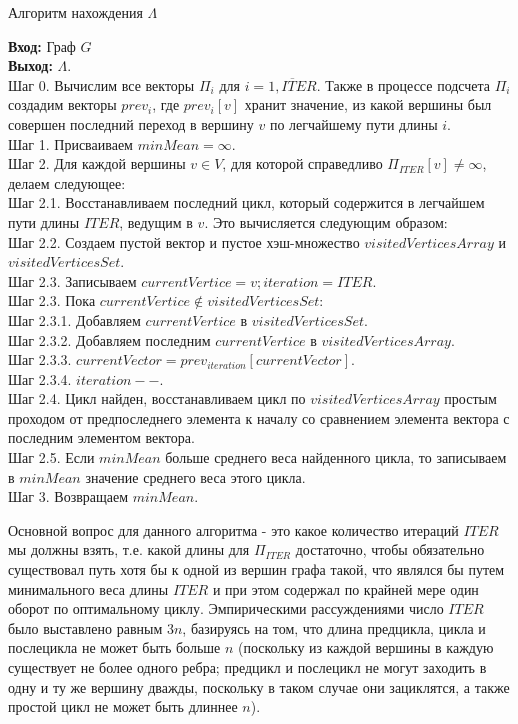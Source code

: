 \documentclass[a4paper,12pt]{report}
\theoremstyle{plain} %
\theoremstyle{definition}
\theoremstyle{remark}
\begin{document}
\begin{large}
\begin{algorithm}[H]
\caption{Алгоритм нахождения $\Lambda$}
\label{diff_graph_construct}
\textbf{Вход:} Граф $G$\\
\textbf{Выход:} $\Lambda$.\\
Шаг 0. Вычислим все векторы $\Pi_i$ для $i = \overline{1, ITER}$. Также в процессе подсчета $\Pi_i$ создадим векторы $prev_i$, где $prev_i[v]$ хранит значение, из какой вершины был совершен последний переход в вершину $v$ по легчайшему пути длины $i$.\\
Шаг 1. Присваиваем $minMean = \infty$.\\
Шаг 2. Для каждой вершины $v \in V$, для которой справедливо $\Pi_{ITER}[v] \ne \infty$, делаем следующее:\\
Шаг 2.1. Восстанавливаем последний цикл, который содержится в легчайшем пути длины $ITER$, ведущим в $v$. Это вычисляется следующим образом:\\
Шаг 2.2. Создаем пустой вектор и пустое хэш-множество $visitedVerticesArray$ и $visitedVerticesSet$.\\
Шаг 2.3. Записываем $currentVertice = v; iteration = ITER$.\\
Шаг 2.3. Пока $currentVertice \notin visitedVerticesSet$:\\
Шаг 2.3.1. Добавляем $currentVertice$ в $visitedVerticesSet$.\\
Шаг 2.3.2. Добавляем последним $currentVertice$ в $visitedVerticesArray$.\\
Шаг 2.3.3. $currentVector = prev_{iteration}[currentVector]$.\\
Шаг 2.3.4. $iteration--$.\\
Шаг 2.4. Цикл найден, восстанавливаем цикл по $visitedVerticesArray$ простым проходом от предпоследнего элемента к началу со сравнением элемента вектора с последним элементом вектора.\\
Шаг 2.5. Если $minMean$ больше среднего веса найденного цикла, то записываем в $minMean$ значение среднего веса этого цикла.\\
Шаг 3. Возвращаем $minMean$.\\ 
\end{algorithm}

Основной вопрос для данного алгоритма - это какое количество итераций $ITER$ мы должны взять, т.е. какой длины для $\Pi_{ITER}$ достаточно, чтобы обязательно существовал путь хотя бы к одной из вершин графа такой, что являлся бы путем минимального веса длины $ITER$ и при этом содержал по крайней мере один оборот по оптимальному циклу. Эмпирическими рассуждениями число $ITER$ было выставлено равным $3n$, базируясь на том, что длина предцикла, цикла и послецикла не может быть больше $n$ (поскольку из каждой вершины в каждую существует не более одного ребра; предцикл и послецикл не могут заходить в одну и ту же вершину дважды, поскольку в таком случае они зациклятся, а также простой цикл не может быть длиннее $n$).


\end{large}
\end{document}
